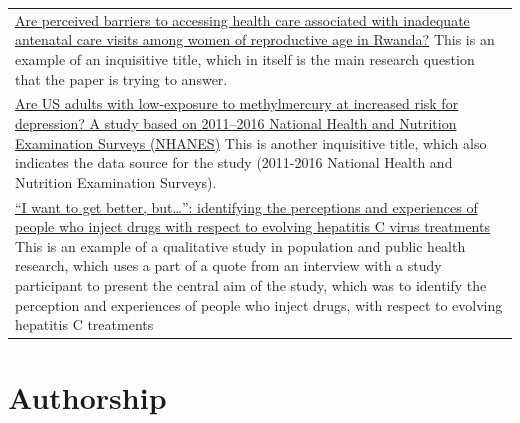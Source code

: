 \documentclass[
]{book}
\begin{document}
\begin{longtable}[]{@{}
  >{\raggedright\arraybackslash}p{}@{}}
\href{https://bmcpregnancychildbirth.biomedcentral.com/articles/10.1186/s12884-020-2775-8}{Are perceived barriers to accessing health care associated with inadequate antenatal care visits among women of reproductive age in Rwanda?} This is an example of an inquisitive title, which in itself is the main research question that the paper is trying to answer. \\
\href{https://link.springer.com/article/10.1007/s00420-020-01592-9}{Are US adults with low-exposure to methylmercury at increased risk for depression? A study based on 2011--2016 National Health and Nutrition Examination Surveys (NHANES)} This is another inquisitive title, which also indicates the data source for the study (2011-2016 National Health and Nutrition Examination Surveys). \\
\href{https://link.springer.com/article/10.1186/s12939-021-01420-7}{``I want to get better, but\ldots{}'': identifying the perceptions and experiences of people who inject drugs with respect to evolving hepatitis C virus treatments} This is an example of a qualitative study in population and public health research, which uses a part of a quote from an interview with a study participant to present the central aim of the study, which was to identify the perception and experiences of people who inject drugs, with respect to evolving hepatitis C treatments \\
\bottomrule
\end{longtable}

\hypertarget{authorship}{%
\chapter{Authorship}\label{authorship}}
\end{document}
